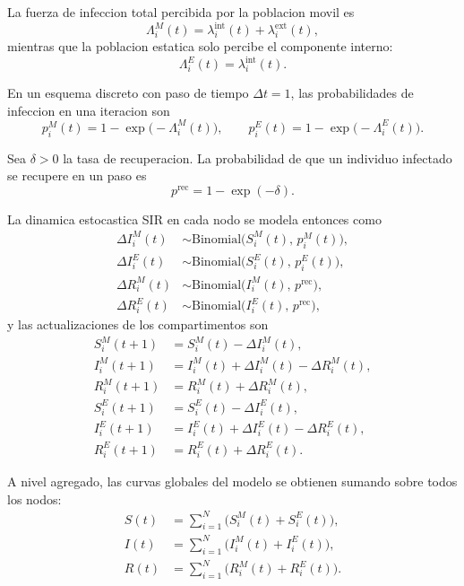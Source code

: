 La fuerza de infeccion total percibida por la poblacion movil es
\begin{equation}
  \Lambda_i^M(t) = \lambda_i^{\text{int}}(t) + \lambda_i^{\text{ext}}(t),
\end{equation}
mientras que la poblacion estatica solo percibe el componente interno:
\begin{equation}
  \Lambda_i^E(t) = \lambda_i^{\text{int}}(t).
\end{equation}

En un esquema discreto con paso de tiempo $\Delta t = 1$, las probabilidades de infeccion en una iteracion son
\begin{equation}
  p_i^M(t) = 1 - \exp\big(-\Lambda_i^M(t)\big), \qquad
  p_i^E(t) = 1 - \exp\big(-\Lambda_i^E(t)\big).
\end{equation}

Sea $\delta > 0$ la tasa de recuperacion. La probabilidad de que un individuo infectado se recupere en un paso es
\begin{equation}
  p^{\text{rec}} = 1 - \exp(-\delta).
\end{equation}

La dinamica estocastica SIR en cada nodo se modela entonces como
\begin{align}
  \Delta I_i^M(t) &\sim \text{Binomial}\big(S_i^M(t),\, p_i^M(t)\big), \\
  \Delta I_i^E(t) &\sim \text{Binomial}\big(S_i^E(t),\, p_i^E(t)\big), \\
  \Delta R_i^M(t) &\sim \text{Binomial}\big(I_i^M(t),\, p^{\text{rec}}\big), \\
  \Delta R_i^E(t) &\sim \text{Binomial}\big(I_i^E(t),\, p^{\text{rec}}\big),
\end{align}
y las actualizaciones de los compartimentos son
\begin{align}
  S_i^M(t+1) &= S_i^M(t) - \Delta I_i^M(t), \\
  I_i^M(t+1) &= I_i^M(t) + \Delta I_i^M(t) - \Delta R_i^M(t), \\
  R_i^M(t+1) &= R_i^M(t) + \Delta R_i^M(t), \\
  S_i^E(t+1) &= S_i^E(t) - \Delta I_i^E(t), \\
  I_i^E(t+1) &= I_i^E(t) + \Delta I_i^E(t) - \Delta R_i^E(t), \\
  R_i^E(t+1) &= R_i^E(t) + \Delta R_i^E(t).
\end{align}

A nivel agregado, las curvas globales del modelo se obtienen sumando sobre todos los nodos:
\begin{align}
  S(t) &= \sum_{i=1}^N \big( S_i^M(t) + S_i^E(t) \big), \\
  I(t) &= \sum_{i=1}^N \big( I_i^M(t) + I_i^E(t) \big), \\
  R(t) &= \sum_{i=1}^N \big( R_i^M(t) + R_i^E(t) \big).
\end{align}


